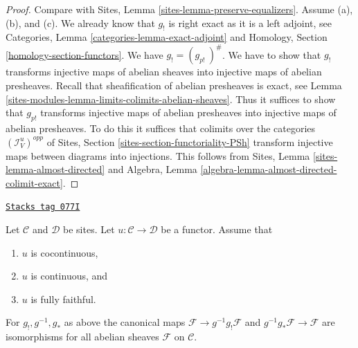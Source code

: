 \begin{proof}
Compare with
Sites, Lemma \ref{sites-lemma-preserve-equalizers}.
Assume (a), (b), and (c).
We already know that $g_!$ is right exact as it is a left adjoint, see
Categories, Lemma \ref{categories-lemma-exact-adjoint} and
Homology, Section \ref{homology-section-functors}.
We have $g_! = (g_{p!}\ )^\#$. We have to show that
$g_!$ transforms injective maps of abelian sheaves into injective maps
of abelian presheaves.
Recall that sheafification of abelian presheaves is exact, see
Lemma \ref{sites-modules-lemma-limits-colimits-abelian-sheaves}.
Thus it suffices to show that $g_{p!}$ transforms injective maps of
abelian presheaves into injective maps of abelian presheaves.
To do this it suffices that colimits over the categories
$(\mathcal{I}_V^u)^{opp}$ of
Sites, Section \ref{sites-section-functoriality-PSh}
transform injective maps between diagrams into injections.
This follows from
Sites, Lemma \ref{sites-lemma-almost-directed}
and
Algebra, Lemma \ref{algebra-lemma-almost-directed-colimit-exact}.
\end{proof}

\begin{lemma}
\label{sites-modules-lemma-back-and-forth}
\href{https://stacks.math.columbia.edu/tag/077I}{\texttt{Stacks tag 077I}}

Let $\mathcal{C}$ and $\mathcal{D}$ be sites.
Let $u : \mathcal{C} \to \mathcal{D}$ be a functor.
Assume that
\begin{enumerate}
\item[(a)] $u$ is cocontinuous,
\item[(b)] $u$ is continuous, and
\item[(c)] $u$ is fully faithful.
\end{enumerate}
For $g_!, g^{-1}, g_*$ as above the canonical maps
$\mathcal{F} \to g^{-1}g_!\mathcal{F}$ and
$g^{-1}g_*\mathcal{F} \to \mathcal{F}$
are isomorphisms
for all abelian sheaves $\mathcal{F}$ on $\mathcal{C}$.
\end{lemma}

